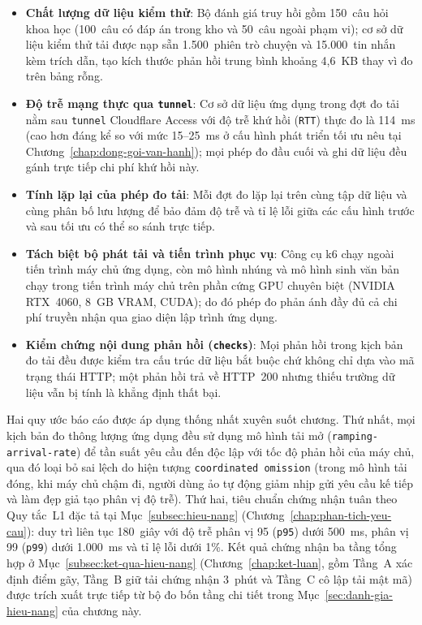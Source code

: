 \begin{itemize}
\item[--] \textbf{Chất lượng dữ liệu kiểm thử}: Bộ đánh giá truy hồi gồm 150~câu hỏi khoa học (100~câu có đáp án trong kho và 50~câu ngoài phạm vi); cơ sở dữ liệu kiểm thử tải được nạp sẵn 1.500~phiên trò chuyện và 15.000~tin nhắn kèm trích dẫn, tạo kích thước phản hồi trung bình khoảng 4,6~KB thay vì đo trên bảng rỗng.
\item[--] \textbf{Độ trễ mạng thực qua \texttt{tunnel}}: Cơ sở dữ liệu ứng dụng trong đợt đo tải nằm sau \texttt{tunnel} Cloudflare Access với độ trễ khứ hồi (\texttt{RTT}) thực đo là 114~ms (cao hơn đáng kể so với mức 15--25~ms ở cấu hình phát triển tối ưu nêu tại Chương~\ref{chap:dong-goi-van-hanh}); mọi phép đo đầu cuối và ghi dữ liệu đều gánh trực tiếp chi phí khứ hồi này.
\item[--] \textbf{Tính lặp lại của phép đo tải}: Mỗi đợt đo lặp lại trên cùng tập dữ liệu và cùng phân bố lưu lượng để bảo đảm độ trễ và tỉ lệ lỗi giữa các cấu hình trước và sau tối ưu có thể so sánh trực tiếp.
\item[--] \textbf{Tách biệt bộ phát tải và tiến trình phục vụ}: Công cụ k6 chạy ngoài tiến trình máy chủ ứng dụng, còn mô hình nhúng và mô hình sinh văn bản chạy trong tiến trình máy chủ trên phần cứng GPU chuyên biệt (NVIDIA RTX~4060, 8~GB VRAM, CUDA); do đó phép đo phản ánh đầy đủ cả chi phí truyền nhận qua giao diện lập trình ứng dụng.
\item[--] \textbf{Kiểm chứng nội dung phản hồi (\texttt{checks})}: Mọi phản hồi trong kịch bản đo tải đều được kiểm tra cấu trúc dữ liệu bắt buộc chứ không chỉ dựa vào mã trạng thái HTTP; một phản hồi trả về HTTP~200 nhưng thiếu trường dữ liệu vẫn bị tính là khẳng định thất bại.
\end{itemize}

Hai quy ước báo cáo được áp dụng thống nhất xuyên suốt chương. Thứ nhất, mọi kịch bản đo thông lượng ứng dụng đều sử dụng mô hình tải mở (\texttt{ramping-\allowbreak{}arrival-\allowbreak{}rate}) để tần suất yêu cầu đến độc lập với tốc độ phản hồi của máy chủ, qua đó loại bỏ sai lệch do hiện tượng \texttt{coordinated omission} (trong mô hình tải đóng, khi máy chủ chậm đi, người dùng ảo tự động giảm nhịp gửi yêu cầu kế tiếp và làm đẹp giả tạo phân vị độ trễ). Thứ hai, tiêu chuẩn chứng nhận tuân theo Quy tắc~L1 đặc tả tại Mục~\ref{subsec:hieu-nang} (Chương~\ref{chap:phan-tich-yeu-cau}): duy trì liên tục 180~giây với độ trễ phân vị 95 (\texttt{p95}) dưới 500~ms, phân vị 99 (\texttt{p99}) dưới 1.000~ms và tỉ lệ lỗi dưới 1\%. Kết quả chứng nhận ba tầng tổng hợp ở Mục~\ref{subsec:ket-qua-hieu-nang} (Chương~\ref{chap:ket-luan}, gồm Tầng~A xác định điểm gãy, Tầng~B giữ tải chứng nhận 3~phút và Tầng~C cô lập tải mật mã) được trích xuất trực tiếp từ bộ đo bốn tầng chi tiết trong Mục~\ref{sec:danh-gia-hieu-nang} của chương này.

